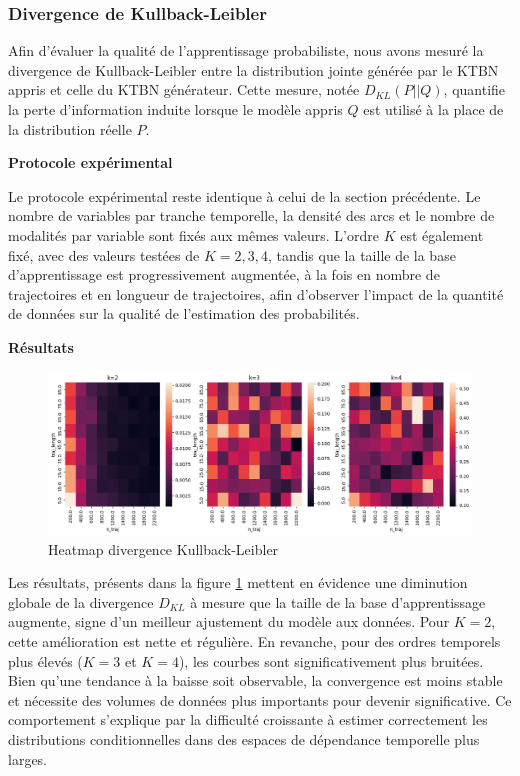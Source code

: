 \documentclass{article}
\begin{document}
\subsubsection{Divergence de Kullback-Leibler}

Afin d'évaluer la qualité de l'apprentissage probabiliste, nous avons mesuré la divergence de Kullback-Leibler
entre la distribution jointe générée par le KTBN appris et celle du KTBN générateur. Cette mesure, notée
$ D_{KL} (P||Q)$, quantifie la perte d'information induite lorsque le modèle appris $Q$ est utilisé à la place
de la distribution réelle $P$.

\textbf{Protocole expérimental}

Le protocole expérimental reste identique à celui de la section précédente. Le nombre de variables par tranche
temporelle, la densité des arcs et le nombre de modalités par variable sont fixés aux mêmes valeurs.
L'ordre $K$ est également fixé, avec des valeurs testées de $K=2,3,4$, tandis que la taille de la base d'apprentissage
est progressivement augmentée, à la fois en nombre de trajectoires et en longueur de trajectoires, afin d'observer
l'impact de la quantité de données sur la qualité de l'estimation des probabilités.

\textbf{Résultats}

\begin{figure}[ht]
    \centering
    \includegraphics[width=\linewidth]{img/klpq.png}
    \caption{Heatmap divergence Kullback-Leibler}
    \label{fig:klpq}
\end{figure}

Les résultats, présents dans la figure \ref{fig:klpq} mettent en évidence une diminution globale de la
divergence $D_{KL}$  à mesure que la taille de la base d'apprentissage augmente, signe d'un meilleur
ajustement du modèle aux données. Pour $K=2$, cette amélioration est nette et régulière. En revanche,
pour des ordres temporels plus élevés ($K=3$ et $K=4$), les courbes sont significativement plus bruitées.
Bien qu'une tendance à la baisse soit observable, la convergence est moins stable et nécessite des volumes de
données plus importants pour devenir significative. Ce comportement s'explique par la difficulté croissante à estimer
correctement les distributions conditionnelles dans des espaces de dépendance temporelle plus larges.
\end{document}
